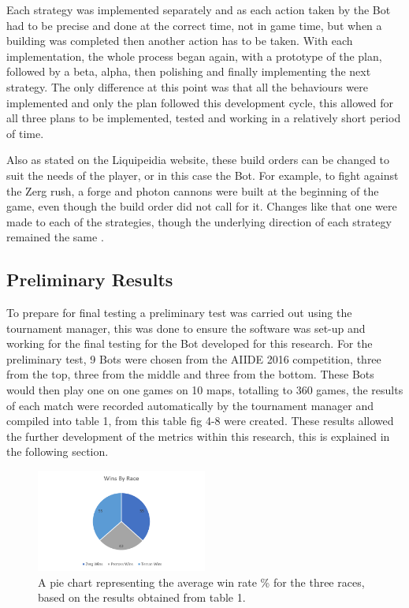 \documentclass[journal]{IEEEtran}
\begin{document}
	Each strategy was implemented separately and as each action taken by the Bot had to be precise and done at the correct time, not in game time, but when a building was completed then another action has to be taken. With each implementation, the whole process began again, with a prototype of the plan, followed by a beta, alpha, then polishing and finally implementing the next strategy. The only difference at this point was that all the behaviours were implemented and only the plan followed this development cycle, this allowed for all three plans to be implemented, tested and working in a relatively short period of time.
	
	Also as stated on the Liquipeidia website, these build orders can be changed to suit the needs of the player, or in this case the Bot. For example, to fight against the Zerg rush, a forge and photon cannons were built at the beginning of the game, even though the build order did not call for it. Changes like that one were made to each of the strategies, though the underlying direction of each strategy remained the same \cite{Alter}.
	
	\subsection{Preliminary Results}
	To prepare for final testing a preliminary test was carried out using the tournament manager, this was done to ensure the software was set-up and working for the final testing for the Bot developed for this research. For the preliminary test, 9 Bots were chosen from the AIIDE 2016 competition, three from the top, three from the middle and three from the bottom. These Bots would then play one on one games on 10 maps, totalling to 360 games, the results of each match were recorded automatically by the tournament manager and compiled into table 1, from this table fig 4-8 were created. These results allowed the further development of the metrics within this research, this is explained in the following section.
	
	\begin{figure}[H]
		\centering
		\includegraphics[width=0.5\textwidth]{RacePie}
		\caption{A pie chart representing the average win rate \% for the three races, based on the results obtained from table 1.}
		\label{Fig4}
	\end{figure}
\end{document}
